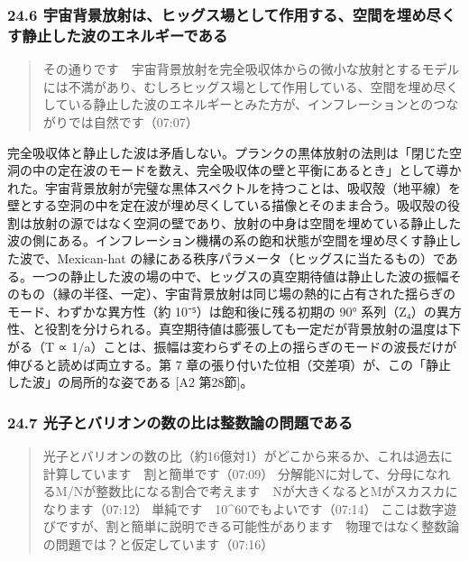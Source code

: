 \documentclass[
  a4paper,
]{ltjsarticle}
\begin{document}
\subsubsection{24.6
宇宙背景放射は、ヒッグス場として作用する、空間を埋め尽くす静止した波のエネルギーである}\label{ux5b87ux5b99ux80ccux666fux653eux5c04ux306fux30d2ux30c3ux30b0ux30b9ux5834ux3068ux3057ux3066ux4f5cux7528ux3059ux308bux7a7aux9593ux3092ux57cbux3081ux5c3dux304fux3059ux9759ux6b62ux3057ux305fux6ce2ux306eux30a8ux30cdux30ebux30aeux30fcux3067ux3042ux308b}

\begin{quote}
その通りです　宇宙背景放射を完全吸収体からの微小な放射とするモデルには不満があり、むしろヒッグス場として作用している、空間を埋め尽くしている静止した波のエネルギーとみた方が、インフレーションとのつながりでは自然です（07:07）
\end{quote}

完全吸収体と静止した波は矛盾しない。プランクの黒体放射の法則は「閉じた空洞の中の定在波のモードを数え、完全吸収体の壁と平衡にあるとき」として導かれた。宇宙背景放射が完璧な黒体スペクトルを持つことは、吸収殻（地平線）を壁とする空洞の中を定在波が埋め尽くしている描像とそのまま合う。吸収殻の役割は放射の源ではなく空洞の壁であり、放射の中身は空間を埋めている静止した波の側にある。インフレーション機構の系の飽和状態が空間を埋め尽くす静止した波で、Mexican-hat
の縁にある秩序パラメータ（ヒッグスに当たるもの）である。一つの静止した波の場の中で、ヒッグスの真空期待値は静止した波の振幅そのもの（縁の半径、一定）、宇宙背景放射は同じ場の熱的に占有された揺らぎのモード、わずかな異方性（約
10⁻⁵）は飽和後に残る初期の 90°
系列（Z₄）の異方性、と役割を分けられる。真空期待値は膨張しても一定だが背景放射の温度は下がる（T
∝
1/a）ことは、振幅は変わらずその上の揺らぎのモードの波長だけが伸びると読めば両立する。第
7 章の張り付いた位相（交差項）が、この「静止した波」の局所的な姿である
{[}A2 第28節{]}。

\subsubsection{24.7
光子とバリオンの数の比は整数論の問題である}\label{ux5149ux5b50ux3068ux30d0ux30eaux30aaux30f3ux306eux6570ux306eux6bd4ux306fux6574ux6570ux8ad6ux306eux554fux984cux3067ux3042ux308b}

\begin{quote}
光子とバリオンの数の比（約16億対1）がどこから来るか、これは過去に計算しています　割と簡単です（07:09）
分解能Nに対して、分母になれるM/Nが整数比になる割合で考えます　Nが大きくなるとMがスカスカになります（07:12）
単純です　10\^{}60でもよいです（07:14）
ここは数字遊びですが、割と簡単に説明できる可能性があります　物理ではなく整数論の問題では？と仮定しています（07:16）
\end{quote}
\end{document}
